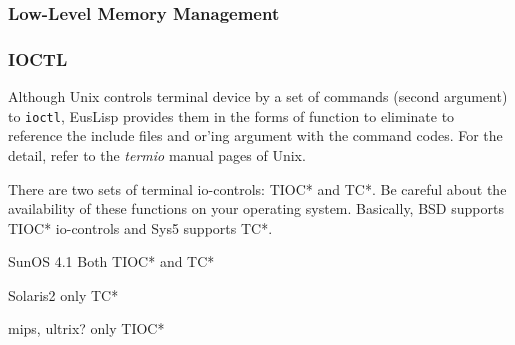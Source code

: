 \subsubsection{Low-Level Memory Management}
\begin{refdesc}







\end{refdesc}

\subsubsection{IOCTL}
Although Unix controls terminal device by a set of commands (second argument) to 
{\tt ioctl}, EusLisp provides them in the forms of function to eliminate
to reference the include files and or'ing argument with the command codes.
For the detail, refer to the {\em termio} manual pages of Unix.

There are two sets of terminal io-controls: TIOC* and TC*.
Be careful about the availability of these functions on your operating system.
Basically, BSD supports TIOC* io-controls and Sys5 supports TC*.
\begin{description}
\item{SunOS 4.1} Both TIOC* and TC*
\item{Solaris2} only TC*
\item{mips, ultrix?} only TIOC*
\end{description}

